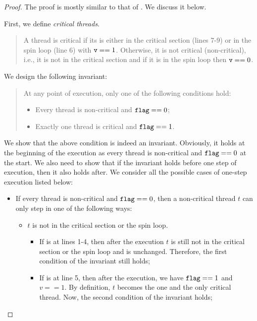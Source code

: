 \documentclass{article}[10pt]
\begin{document}
\begin{proof}
  The proof is mostly similar to that of
  . We discuss it below.

  First, we define \emph{critical threads}. 
  \begin{quote}
    A thread is critical if its  is either in the critical
    section (lines 7-9) or in the spin loop (line 6) with $\text{\ttfamily v} ==
    1$. Otherwise, it is not critical (non-critical), i.e., it is not in the critical
    section and if it is in the spin loop then $\text{\ttfamily v} == 0$.
  \end{quote}
  We design the following invariant:
  \begin{quote}
    At any point of execution, only one of the following conditions hold:
    \begin{itemize}
    \item Every thread is non-critical and $\text{\ttfamily flag} == 0$;
    \item Exactly one thread is critical and $\text{\ttfamily flag} == 1$.
    \end{itemize}
  \end{quote}
  We show that the above condition is indeed an
  invariant. Obviously, it holds at the beginning of the execution as
  every thread is non-critical and $\text{\ttfamily flag} == 0$ at the start. We also
  need to show that if the invariant holds before one step of
  execution, then it also holds after. We consider all the possible cases
  of one-step execution listed below:
  \begin{itemize}
  \item If every thread is non-critical and $\text{\ttfamily flag} == 0$, then a
    non-critical thread $t$ can only step in one of the following ways:
    \begin{itemize}
    \item $t$ is not in the critical section or the spin loop. 

      \begin{itemize}
      \item If  is at lines 1-4, then after the execution $t$
        is still not in the critical section or the spin loop and
        \kflag is unchanged. Therefore, the first condition of the
        invariant still holds;

      \item If  is at line 5, then after the execution, we
        have $\text{\ttfamily flag} == 1$ and $v == 1$. By definition, $t$ becomes
        the one and the only critical thread. Now, the second
        condition of the invariant holds;


\end{itemize}
\end{itemize}
\end{itemize}
\end{proof}
\end{document}
